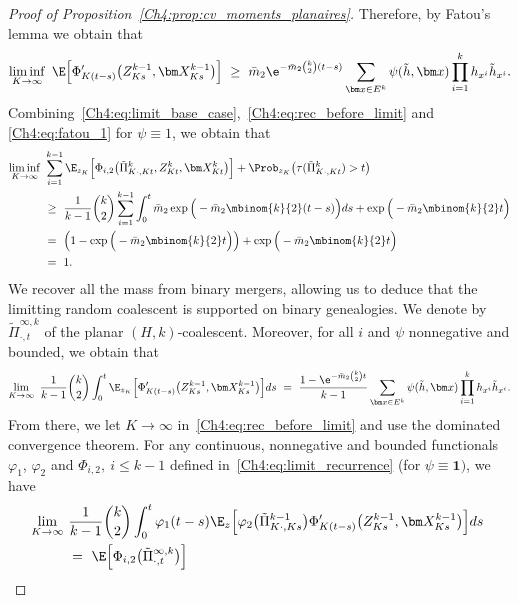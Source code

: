 \begin{refsegment}
\begin{proof}[Proof of Proposition~\ref{Ch4:prop:cv_moments_planaires}]
Therefore, by Fatou's lemma we obtain that
\begin{equation} \label{Ch4:eq:fatou_1}
  \liminf_{K\to\infty}\ \E\Big[\Phi'_{K(t-s)}\big(
     Z^{k-1}_{Ks},  \bm X^{k-1}_{Ks} \big)\Big]
    \ \geq\ 
   \bar m_2\e^{-\bar m_2\binom{k}{2}(t-s)}\sum_{\bm x\in E^k}\psi(\tilde h, \bm x)\prod_{i=1}^k h_{x^i}\tilde h_{x^i}.
\end{equation}
Combining~\eqref{Ch4:eq:limit_base_case},~\eqref{Ch4:eq:rec_before_limit}  and 
\eqref{Ch4:eq:fatou_1} for $\psi\equiv 1$, we obtain that
\begin{align*}
   \liminf_{K \to \infty}\ 
   & \sum_{i=1}^{k-1} 
    \E_{z_K}\Big[\Phi_{i,2}\big(\tilde{\Pi}^k_{K\cdot,Kt}, Z^k_{Kt}, \bm X^k_{Kt} \big)\Big]
    +  \Prob_{z_K}\big(\tau(\tilde{\Pi}^k_{K\cdot,Kt})> t\big)\\
   & \geq\  
        \frac{1}{k-1} \binom{k}{2} 
        \sum_{i=1}^{k-1} \int_0^t 
        \bar m_2\exp\Big(-\bar m_2\mbinom{k}{2}(t-s)\Big) ds 
        +\exp\Big(-\bar m_2\mbinom{k}{2}t\Big) \\
    &=\ \Big( 1-\exp\Big(-\bar m_2\mbinom{k}{2}t\Big) \Big) 
        + \exp\Big(-\bar m_2\mbinom{k}{2}t\Big) \\
    &=\ 1.
\end{align*}
We recover all the mass from binary mergers, allowing us to deduce that the limitting random coalescent is supported
on binary genealogies. We denote by $\tilde{\Pi}^{\infty,k}_{\cdot,t}$ of the planar $(H,k)$-coalescent. Moreover, for all $i$ and $ \psi $ nonnegative and bounded, we obtain that
\begin{multline*}
    \lim_{K \to \infty}\ \frac{1}{k-1} \binom{k}{2} \int_0^t 
    \E_{z_K}\Big[ \Phi'_{K(t-s)} \big(Z^{k-1}_{Ks}, \bm X^{k-1}_{Ks}
    \big)\Big] ds
    \ =\ \frac{1 - \e^{-\bar m_2 \binom{k}{2} t} }{k-1}\sum_{\bm x\in E^k}\psi(\tilde h, \bm x)\prod_{i=1}^kh_{x^i}\tilde h_{x^i}.
\end{multline*}
From there,
we let $K \to \infty$ in~\eqref{Ch4:eq:rec_before_limit} and use the
dominated convergence theorem. For any continuous, nonnegative and bounded functionals $\varphi_1$,
$\varphi_2$ and $\Phi_{i,2},\ i\leq k-1$ defined in~\eqref{Ch4:eq:limit_recurrence} (for $\psi\equiv\bm 1)
$, we have
\begin{align*}
    \lim_{K \to \infty}\ &\frac{1}{k-1} \binom{k}{2} \int_0^t \varphi_1(t-s)
    \E_{z}\Big[\varphi_2\big(\tilde{\Pi}^{k-1}_{K\cdot,Ks}\big)\Phi'_{K(t-s)} \big(  Z^{k-1}_{Ks}, \bm X^{k-1}_{Ks}\big)\Big] ds\ \\
  &   = \ \E\Big[\Phi_{i,2}\big(\tilde{\Pi}^{\infty,k}_{\cdot,t}\big)\Big] \\

\end{align*}
\end{proof}
\end{refsegment}
